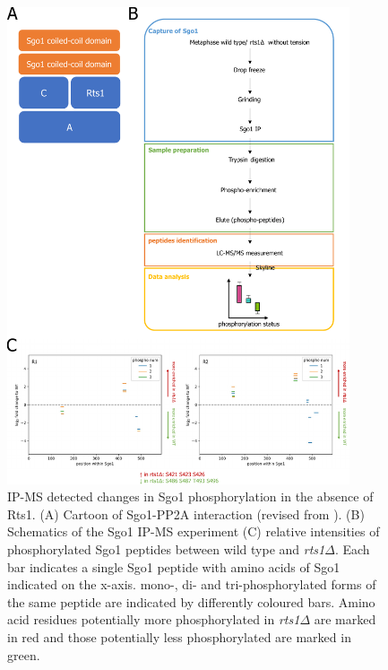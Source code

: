 \begin{figure}[htbp]
  \centering
  \includegraphics[width=0.9\textwidth]{chapter3/figures/Sgo1 phospho in rts1d.pdf}
  \caption[IP-MS detected changes in Sgo1 phosphorylation in the absence of Rts1]{IP-MS detected changes in Sgo1 phosphorylation in the absence of Rts1. (A) Cartoon of Sgo1-PP2A interaction (revised from \cite{Xu2009StructureInteraction}). (B) Schematics of the Sgo1 IP-MS experiment (C) relative intensities of phosphorylated Sgo1 peptides between wild type and \textit{rts1$\Delta$}. Each bar indicates a single Sgo1 peptide with amino acids of Sgo1 indicated on the x-axis. mono-, di- and tri-phosphorylated forms of the same peptide are indicated by differently coloured bars. Amino acid residues potentially more phosphorylated in \textit{rts1$\Delta$} are marked in red and those potentially less phosphorylated are marked in green. }
  \label{fig:sgo1phosphorts1d}
\end{figure}


